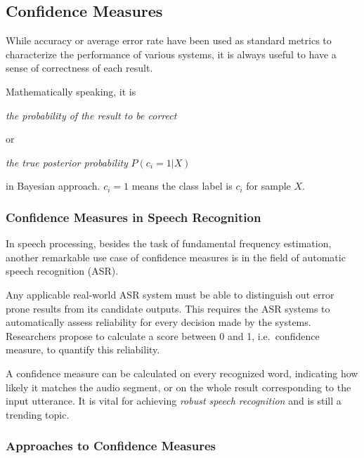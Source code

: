 \documentclass[11pt,a4paper,titlepage]{article}
\begin{document}
\newpage

\subsection{Confidence Measures}

While accuracy or average error rate have been used as standard metrics to characterize the performance of various systems, it is always useful to have a sense of correctness of each result.

\bigskip

Mathematically speaking, it is

\begin{center}
  \textit{the probability of the result to be correct}
\end{center}

or

\begin{center}
  \textit{the true posterior probability} \(P (c_i = 1 | X)\)
\end{center}

in Bayesian approach.
\(c_i = 1\) means the class label is \(c_i\) for sample \(X\).

\subsubsection{Confidence Measures in Speech Recognition}

In speech processing, besides the task of fundamental frequency estimation, another remarkable use case of confidence measures is in the field of automatic speech recognition (ASR).

Any applicable real-world ASR system must be able to distinguish out error prone results from its candidate outputs.
This requires the ASR systems to automatically assess reliability for every decision made by the systems.
Researchers propose to calculate a score between 0 and 1, i.e.\ confidence measure, to quantify this reliability.

A confidence measure can be calculated on every recognized word, indicating how likely it matches the audio segment, or on the whole result corresponding to the input utterance.
It is vital for achieving \textit{robust speech recognition} and is still a trending topic.

\subsubsection{Approaches to Confidence Measures}
\end{document}
